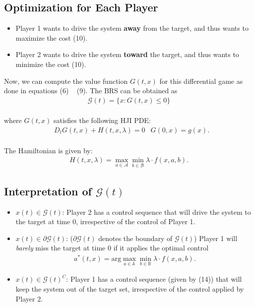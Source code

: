 \documentclass{article}
\begin{document}
\subsection{Optimization for Each Player}
\begin{itemize}
    \item Player 1 wants to drive the system \textbf{away} from the target, and thus wants to maximize the cost (10).
    \item Player 2 wants to drive the system \textbf{toward} the target, and thus wants to minimize the cost (10).
\end{itemize}

Now, we can compute the value function $G(t,x)$ for this differential game as done in equations (6) ~ (9). The BRS can be obtained as
\begin{align}
    \mathcal{G}(t) = \{ x: G(t,x) \leq 0 \}
\end{align}\\
where $G(t,x)$ satisfies the following HJI PDE:
\begin{equation}
    \begin{aligned}
    & D_tG(t,x) + H(t,x,\lambda) = 0
    & G(0,x) = g(x).
    \end{aligned}
\end{equation}
\\
The Hamiltonian is given by:
\begin{align}
    H(t,x,\lambda) = \max_{a \in \mathcal{A}} \min_{b \in \mathcal{B}} \lambda \cdot f(x,a,b).
\end{align}

\subsection{Interpretation of $\mathcal{G}(t)$}
\begin{itemize}
    \item \textbf{$x(t) \in \mathcal{G}(t)$}: Player 2 has a control sequence that will drive the system to the target at time 0, irrespective of the control of Player 1.
    \item \textbf{$x(t) \in \partial \mathcal{G}(t)$}: ($\partial \mathcal{G}(t)$ denotes the boundary of $\mathcal{G}(t)$) Player 1 will \textit{barely} miss the target at time 0 if it applies the optimal control
        \begin{align}
            a^*(t,x) = \text{arg} \max_{a \in \mathbb{A}} \min_{b \in \mathbb{B}} \lambda \cdot f(x,a,b).
        \end{align}
    \item \textbf{$x(t) \in \mathcal{G}(t)^C$}: Player 1 has a control sequence (given by (14)) that will keep the system out of the target set, irrespective of the control applied by Player 2.
\end{itemize}
\end{document}
